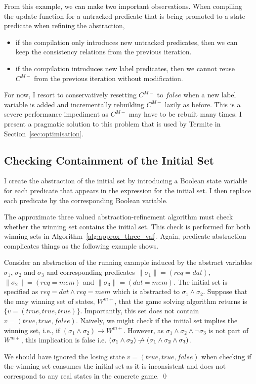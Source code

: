 From this example, we can make two important observations. When compiling the update function for a untracked predicate that is being promoted to a state predicate when refining the abstraction, 

\begin{itemize}
    \item if the compilation only introduces new untracked predicates, then we can keep the consistency relations from the previous iteration.
    \item if the compilation introduces new label predicates, then we cannot reuse $C^{M-}$ from the previous iteration without modification.
\end{itemize}

For now, I resort to conservatively resetting $C^{M-}$ to $false$ when a new label variable is added and incrementally rebuilding $C^{M-}$ lazily as before. This is a severe performance impediment as $C^{M-}$ may have to be rebuilt many times. I present a pragmatic solution to this problem that is used by Termite in Section~\ref{sec:optimisation}.

\subsection{Checking Containment of the Initial Set}
\label{sec:init_containment}

I create the abstraction of the initial set by introducing a Boolean state variable for each predicate that appears in the expression for the initial set. I then replace each predicate by the corresponding Boolean variable.

The approximate three valued abstraction-refinement algorithm must check whether the winning set contains the initial set. This check is performed for both winning sets in Algorithm~\ref{alg:approx_three_val}. Again, predicate abstraction complicates things as the following example shows.

\begin{ex}
    Consider an abstraction of the running example induced by the abstract variables $\sigma_1$, $\sigma_2$ and $\sigma_3$ and corresponding predicates $\|\sigma_1\| = (req=dat)$, $\|\sigma_2\| = (req=mem)$ and $\|\sigma_3\| = (dat=mem)$. The initial set is specified as $req=dat \land req=mem$ which is abstracted to $\sigma_1 \land \sigma_2$. Suppose that the may winning set of states, $W^{m+}$, that the game solving algorithm returns is $\{v=(true, true, true)\}$. Importantly, this set does not contain $v=(true, true, false)$. Naively, we might check if the initial set implies the winning set, i.e., if $(\sigma_1 \land \sigma_2) \rightarrow W^{m+}$. However, as $\sigma_1 \land \sigma_2 \land \neg\sigma_3$ is not part of $W^{m+}$, this implication is false i.e. $(\sigma_1 \land \sigma_2) \centernot\rightarrow (\sigma_1 \land \sigma_2 \land \sigma_3)$.

    We should have ignored the losing state $v=(true, true, false)$ when checking if the winning set consumes the initial set as it is inconsistent and does not correspond to any real states in the concrete game. 
    \qed
\end{ex}

